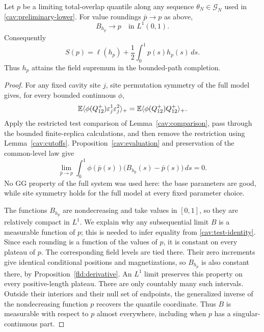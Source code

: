 \begin{proposition}\label{cav:self-consistency}
Let $p$ be a limiting total-overlap quantile along any sequence
$\theta_N\in\mathcal G_N$ used in
\eqref{cav:preliminary-lower}.  For value roundings $\bar p\to p$
as above,
\begin{equation}\label{cav:B-limit}
 B_{h_{\bar p}}\longrightarrow p\quad\text{in }L^1(0,1).
\end{equation}
Consequently
\begin{equation}\label{cav:supremum}
 S(p)=\ell(h_p)+\frac12\int_0^1p(s)h_p(s)\,ds.
\end{equation}
Thus $h_p$ attains the field supremum in the bounded-path completion.
\end{proposition}

\begin{proof}
For any fixed cavity site $j$, site permutation symmetry of the full
model gives, for every bounded continuous $\phi$,
\[
 \mathbb E\langle\phi(Q_{12}^+)\varepsilon_j^1\varepsilon_j^2\rangle_+
 =\mathbb E\langle\phi(Q_{12}^+)Q_{12}^+\rangle_+.
\]
Apply the restricted test comparison of Lemma~\ref{cav:comparison},
pass through the bounded finite-replica calculations, and then remove
the restriction using Lemma~\ref{cav:cutoffs}.  Proposition~\ref{cav:evaluation}
and preservation of the common-level law give
\begin{equation}\label{cav:test-identity}
 \lim_{\bar p\to p}\int_0^1
 \phi(\bar p(s))\big(B_{h_{\bar p}}(s)-\bar p(s)\big)\,ds=0.
\end{equation}
No GG property of the full system was used here: the base parameters
are good, while site symmetry holds for the full model at every fixed
parameter choice.

The functions $B_{h_{\bar p}}$ are nondecreasing and take values in
$[0,1]$, so they are relatively compact in $L^1$.  We explain why any
subsequential limit $B$ is a measurable function of $p$; this is needed
to infer equality from \eqref{cav:test-identity}.  Since each rounding
is a function of the values of $p$, it is constant on every plateau of
$p$.  The corresponding field levels are tied there.  Their zero
increments give identical conditional positions and magnetizations,
so $B_{h_{\bar p}}$ is also constant there, by
Proposition~\ref{fld:derivative}.  An $L^1$ limit preserves this property
on every positive-length plateau.  There are only countably many such
intervals.  Outside their interiors and their null set of endpoints,
the generalized inverse of the nondecreasing function $p$ recovers
the quantile coordinate.  Thus $B$ is measurable with respect to $p$
almost everywhere, including when $p$ has a singular-continuous part.


\end{proof}
